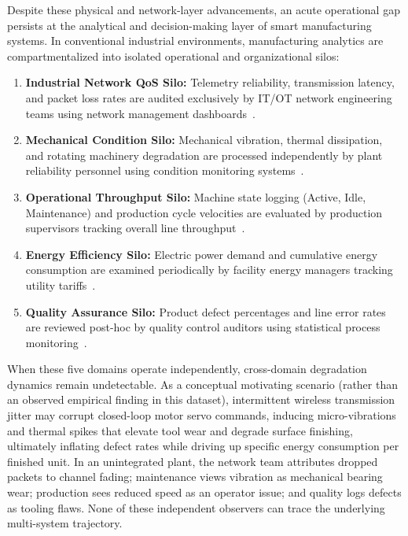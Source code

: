 \documentclass[journal]{IEEEtran}
\begin{document}
Despite these physical and network-layer advancements, an acute operational gap persists at the analytical and decision-making layer of smart manufacturing systems. In conventional industrial environments, manufacturing analytics are compartmentalized into isolated operational and organizational silos:
\begin{enumerate}
    \item \textbf{Industrial Network QoS Silo:} Telemetry reliability, transmission latency, and packet loss rates are audited exclusively by IT/OT network engineering teams using network management dashboards~\cite{Luvisotto2017, Wu2022}.
    \item \textbf{Mechanical Condition Silo:} Mechanical vibration, thermal dissipation, and rotating machinery degradation are processed independently by plant reliability personnel using condition monitoring systems~\cite{Lee2014, Zhang2019}.
    \item \textbf{Operational Throughput Silo:} Machine state logging (Active, Idle, Maintenance) and production cycle velocities are evaluated by production supervisors tracking overall line throughput~\cite{Duflou2012}.
    \item \textbf{Energy Efficiency Silo:} Electric power demand and cumulative energy consumption are examined periodically by facility energy managers tracking utility tariffs~\cite{Kara2011}.
    \item \textbf{Quality Assurance Silo:} Product defect percentages and line error rates are reviewed post-hoc by quality control auditors using statistical process monitoring~\cite{Colosimo2024}.
\end{enumerate}

When these five domains operate independently, cross-domain degradation dynamics remain undetectable. As a conceptual motivating scenario (rather than an observed empirical finding in this dataset), intermittent wireless transmission jitter may corrupt closed-loop motor servo commands, inducing micro-vibrations and thermal spikes that elevate tool wear and degrade surface finishing, ultimately inflating defect rates while driving up specific energy consumption per finished unit. In an unintegrated plant, the network team attributes dropped packets to channel fading; maintenance views vibration as mechanical bearing wear; production sees reduced speed as an operator issue; and quality logs defects as tooling flaws. None of these independent observers can trace the underlying multi-system trajectory.
\end{document}
